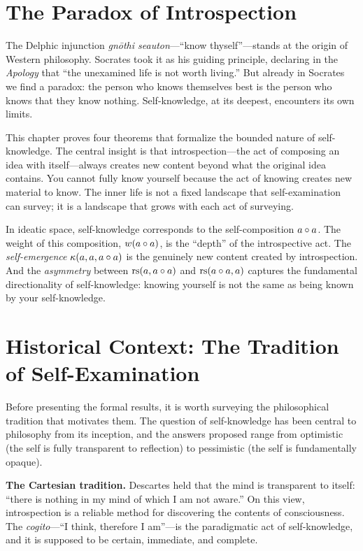 \section{The Paradox of Introspection}

The Delphic injunction \emph{gn\=othi seauton}---``know thyself''---stands
at the origin of Western philosophy. Socrates took it as his guiding
principle, declaring in the \textit{Apology} that ``the unexamined life
is not worth living.'' But already in Socrates we find a paradox: the
person who knows themselves best is the person who knows that they know
nothing. Self-knowledge, at its deepest, encounters its own limits.

This chapter proves four theorems that formalize the bounded nature of
self-knowledge. The central insight is that introspection---the act of
composing an idea with itself---always creates new content beyond what
the original idea contains. You cannot fully know yourself because the
act of knowing creates new material to know. The inner life is not a
fixed landscape that self-examination can survey; it is a landscape
that grows with each act of surveying.

In ideatic space, self-knowledge corresponds to the self-composition
$a \circ a$. The weight of this composition, $w(a \circ a)$, is
the ``depth'' of the introspective act. The \emph{self-emergence}
$\kappa(a, a, a \circ a)$ is the genuinely new content created by
introspection. And the \emph{asymmetry} between $\mathrm{rs}(a, a \circ a)$
and $\mathrm{rs}(a \circ a, a)$ captures the fundamental directionality of
self-knowledge: knowing yourself is not the same as being known by your
self-knowledge.

\section{Historical Context: The Tradition of Self-Examination}

Before presenting the formal results, it is worth surveying the
philosophical tradition that motivates them. The question of
self-knowledge has been central to philosophy from its inception, and
the answers proposed range from optimistic (the self is fully
transparent to reflection) to pessimistic (the self is fundamentally
opaque).

\textbf{The Cartesian tradition.} Descartes held that the mind is
transparent to itself: ``there is nothing in my mind of which I am not
aware.'' On this view, introspection is a reliable method for
discovering the contents of consciousness. The \textit{cogito}---``I
think, therefore I am''---is the paradigmatic act of self-knowledge,
and it is supposed to be certain, immediate, and complete.


